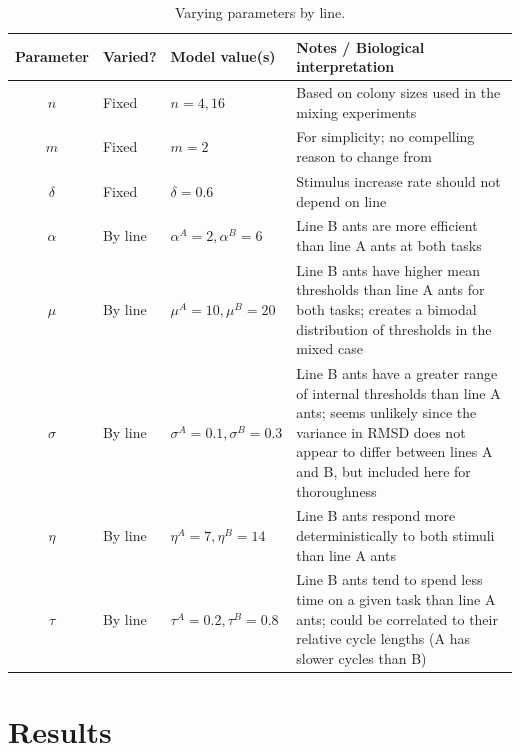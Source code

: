 \documentclass[11pt]{article}
\begin{document}
\begin{table}[H] \small
  \begin{center}
    \begin{tabular}{|c|>{\centering}m{0.6in}|>{\centering}m{1.15in}|m{3.5in}|} 
      \hline
      \textbf{Parameter} & \textbf{Varied?} & \textbf{Model value(s)} & \textbf{Notes / Biological interpretation} \\ \hline
      $n$ & Fixed & $n = 4, 16$ & Based on colony sizes used in the mixing experiments \\ \hline
      $m$ & Fixed & $m = 2$ & For simplicity; no compelling reason to change from \cite{ulrich2018} \\ \hline
      $\delta$ & Fixed & $\delta = 0.6$ & Stimulus increase rate should not depend on line\\ \hline
      $\alpha$ & By line  & $\alpha^A = 2,\alpha^B = 6$ & Line B ants are more efficient than line A ants at both tasks \\ \hline
      $\mu$ & By line  & $\mu^A = 10,\mu^B = 20 $ & Line B ants have higher mean thresholds than line A ants for both tasks; creates a bimodal distribution of thresholds in the mixed case \\ \hline
      $\sigma$ & By line & $\sigma^A = 0.1, \sigma^B = 0.3$ & Line B ants have a greater range of internal thresholds than line A ants; seems unlikely since the variance in RMSD does not appear to differ between lines A and B, but included here for thoroughness \\ \hline
      $\eta$ & By line & $\eta^A = 7, \eta^B = 14 $ &  Line B ants respond more deterministically to both stimuli than line A ants\\ \hline
      $\tau$ & By line & $\tau^A = 0.2,\tau^B = 0.8 $ & Line B ants tend to spend less time on a given task than line A ants; could be correlated to their relative cycle lengths (A has slower cycles than B) \\ \hline
    \end{tabular}
    \caption{Varying parameters by line.}
    \label{tab:byline}
  \end{center}
\end{table}


\section{Results}
\end{document}
